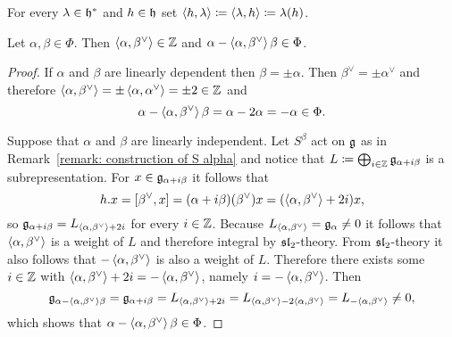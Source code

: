 \begin{defi}
 For every $\lambda \in \mathfrak{h}^*$ and $h \in \mathfrak{h}$ set $\left\langle h, \lambda\right\rangle \coloneqq \left\langle \lambda, h\right\rangle \coloneqq \lambda(h)$.
\end{defi}


\begin{prop}
 Let $\alpha, \beta \in \Phi$. Then $\left\langle \alpha, \beta^\vee\right\rangle \in \mathbb{Z}$ and $\alpha - \left\langle \alpha, \beta^\vee\right\rangle \beta \in \Phi$.
\end{prop}
\begin{proof}
 If $\alpha$ and $\beta$ are linearly dependent then $\beta = \pm \alpha$. Then $\beta^\vee = \pm \alpha^\vee$ and therefore $\left\langle \alpha, \beta^\vee\right\rangle = \pm \left\langle \alpha, \alpha^\vee\right\rangle = \pm 2 \in \mathbb{Z}$ and
 \[
 \alpha - \left\langle \alpha, \beta^\vee\right\rangle \beta
 = \alpha - 2 \alpha
 = -\alpha \in \Phi.
 \]
 
 Suppose that $\alpha$ and $\beta$ are linearly independent. Let $S^\beta$ act on $\mathfrak{g}$ as in Remark~\ref{remark: construction of S alpha} and notice that $L \coloneqq \bigoplus_{i \in \mathbb{Z}} \mathfrak{g}_{\alpha+i\beta}$ is a subrepresentation. For $x \in \mathfrak{g}_{\alpha+i\beta}$ it follows that
 \[
  h.x = [\beta^\vee, x] = (\alpha+i\beta)(\beta^\vee)x = (\left\langle \alpha, \beta^\vee\right\rangle+2i)x,
 \]
 so $\mathfrak{g}_{\alpha+i\beta} = L_{\left\langle \alpha, \beta^\vee\right\rangle+2i}$ for every $i \in \mathbb{Z}$. Because $L_{\left\langle \alpha, \beta^\vee\right\rangle} = \mathfrak{g}_\alpha \neq 0$ it follows that $\left\langle \alpha, \beta^\vee\right\rangle$ is a weight of $L$ and therefore integral by $\mathfrak{sl}_2$-theory. From $\mathfrak{sl}_2$-theory it also follows that $-\left\langle \alpha, \beta^\vee\right\rangle$ is also a weight of $L$. Therefore there exists some $i \in \mathbb{Z}$ with $\left\langle \alpha, \beta^\vee\right\rangle + 2i = -\left\langle \alpha, \beta^\vee\right\rangle$, namely $i = -\left\langle \alpha, \beta^\vee\right\rangle$. Then
 \[
  \mathfrak{g}_{\alpha - \left\langle \alpha, \beta^\vee\right\rangle \beta}
  = \mathfrak{g}_{\alpha + i\beta}
  = L_{\left\langle \alpha, \beta^\vee\right\rangle+2i}
  = L_{\left\langle \alpha, \beta^\vee\right\rangle -2\left\langle \alpha, \beta^\vee\right\rangle}
  = L_{-\left\langle \alpha, \beta^\vee\right\rangle}
  \neq 0,
 \]
 which shows that $\alpha - \left\langle \alpha, \beta^\vee\right\rangle \beta \in \Phi$.
\end{proof}

















